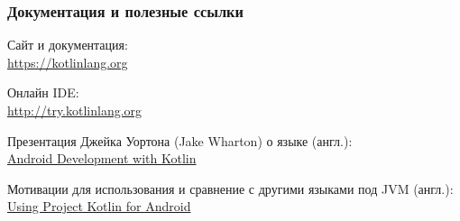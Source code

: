 \documentclass{beamer}
\begin{document}
\begin{frame}
    \frametitle{Документация и полезные ссылки}
    \begin{description}
        \item Сайт и документация: \\
            \url{https://kotlinlang.org}
        \item Онлайн IDE: \\
            \url{http://try.kotlinlang.org}
        \item Презентация Джейка Уортона (Jake Wharton) о языке (англ.): \\
            \href{http://www.youtube.com/watch?v=A2LukgT2mKc}{Android Development with Kotlin}
        \item Мотивации для использования и сравнение с другими языками под JVM (англ.): \\
            \href{https://docs.google.com/document/d/1ReS3ep-hjxWA8kZi0YqDbEhCqTt29hG8P44aA9W0DM8/edit?hl=en&forcehl=1}{Using Project Kotlin for Android}
    \end{description}
\end{frame}
\end{document}

